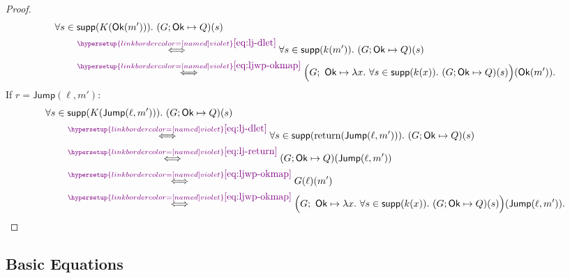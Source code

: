 \documentclass[acmsmall,natbib,review,screen,anonymous,10pt]{acmart}
\makeatletter
\let\@msm@th@eqref\eqref
\renewcommand{\eqref}[1]{%
  \begingroup
  \leavevmode
  \color{violet}%
  \hypersetup{linkbordercolor=[named]{violet}}%
  \@msm@th@eqref{#1}%
  \endgroup
}
\makeatother
\begin{document}
\begin{proof}
\[
  \begin{aligned}
  &\forall s\in\supp(K(\mathsf{Ok}(m'))).\ (G;\mathsf{Ok}\mapsto Q)(s)\\
  &\qquad\overset{\eqref{eq:lj-dlet}}{\iff}
  \forall s\in\supp(k(m')).\ (G;\mathsf{Ok}\mapsto Q)(s)\\
  &\qquad\overset{\eqref{eq:ljwp-okmap}}{\iff}
  \Bigl(G;\ \mathsf{Ok}\mapsto\lambda x.\
  \forall s\in\supp(k(x)).\ (G;\mathsf{Ok}\mapsto Q)(s)\Bigr)(\mathsf{Ok}(m')).
  \end{aligned}
\]
If $r=\mathsf{Jump}(\ell,m')$:
\[
  \begin{aligned}
  &\forall s\in\supp(K(\mathsf{Jump}(\ell,m'))).\ (G;\mathsf{Ok}\mapsto Q)(s)\\
  &\qquad\overset{\eqref{eq:lj-dlet}}{\iff}
  \forall s\in\supp(\operatorname{return}(\mathsf{Jump}(\ell,m'))).\
  (G;\mathsf{Ok}\mapsto Q)(s)\\
  &\qquad\overset{\eqref{eq:lj-return}}{\iff}
  (G;\mathsf{Ok}\mapsto Q)(\mathsf{Jump}(\ell,m'))\\
  &\qquad\overset{\eqref{eq:ljwp-okmap}}{\iff}
  G(\ell)(m')\\
  &\qquad\overset{\eqref{eq:ljwp-okmap}}{\iff}
  \Bigl(G;\ \mathsf{Ok}\mapsto\lambda x.\
  \forall s\in\supp(k(x)).\ (G;\mathsf{Ok}\mapsto Q)(s)\Bigr)(\mathsf{Jump}(\ell,m')).
  \end{aligned}
\]
\end{proof}

\subsection{Basic Equations}\label{app:lj-equations}
\end{document}

